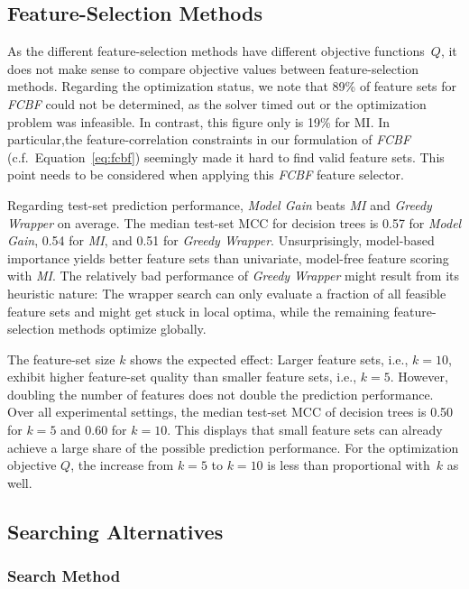 \documentclass{article}
\theoremstyle{definition}
\begin{document}
\subsection{Feature-Selection Methods}
\label{sec:evaluation:feature-selection}

As the different feature-selection methods have different objective functions~$Q$, it does not make sense to compare objective values between feature-selection methods.
Regarding the optimization status, we note that 89\% of feature sets for \emph{FCBF} could not be determined, as the solver timed out or the optimization problem was infeasible.
In contrast, this figure only is 19\% for MI.
In particular,the feature-correlation constraints in our formulation of \emph{FCBF} (c.f.~Equation~\ref{eq:fcbf}) seemingly made it hard to find valid feature sets.
This point needs to be considered when applying this \emph{FCBF} feature selector.

Regarding test-set prediction performance, \emph{Model Gain} beats \emph{MI} and \emph{Greedy Wrapper} on average.
The median test-set MCC for decision trees is 0.57 for \emph{Model Gain}, 0.54 for \emph{MI}, and 0.51 for \emph{Greedy Wrapper}.
Unsurprisingly, model-based importance yields better feature sets than univariate, model-free feature scoring with \emph{MI}.
The relatively bad performance of \emph{Greedy Wrapper} might result from its heuristic nature:
The wrapper search can only evaluate a fraction of all feasible feature sets and might get stuck in local optima, while the remaining feature-selection methods optimize globally.

The feature-set size $k$ shows the expected effect:
Larger feature sets, i.e., $k=10$, exhibit higher feature-set quality than smaller feature sets, i.e., $k=5$.
However, doubling the number of features does not double the prediction performance.
Over all experimental settings, the median test-set MCC of decision trees is 0.50 for $k=5$ and 0.60 for $k=10$.
This displays that small feature sets can already achieve a large share of the possible prediction performance.
For the optimization objective $Q$, the increase from $k=5$ to $k=10$ is less than proportional with~$k$ as well.

\subsection{Searching Alternatives}
\label{sec:evaluation:search}

\subsubsection{Search Method}
\label{sec:evaluation:search:method}
\end{document}
